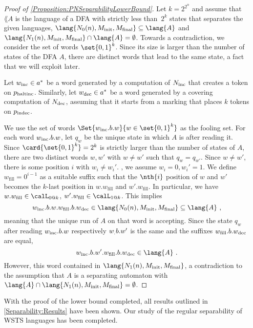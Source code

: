 \documentclass[../../diss.tex]{subfiles}
\begin{document}
\begin{proof}[Proof of \cref{Proposition:PNSeparabilityLowerBound}]
    Let $k = 2^{2^n}$ and assume that $\lang{A}$ is the language of a DFA with strictly less than~$2^k$ states that separates the given languages, \ie $\lang{N_0(n),\Minit,\Mfinal} \subseteq \lang{A}$ and $\lang{N_1(n),\Minit,\Mfinal} \cap \lang{A} = \emptyset$.
    Towards a contradiction, we consider the set of words $\set{0,1}^k$.
    Since its size is larger than the number of states of the DFA $A$, there are distinct words that lead to the same state, a fact that we will exploit later.

    Let $w_{\text{inc}} \in a^*$ be a word generated by a computation of $N_{\text{inc}}$ that creates a token on $p_{\text{haltinc}}$.
    Similarly, let $w_{\text{dec}} \in a^*$ be a word generated by a covering computation of $N_{\text{dec}}$, assuming that it starts from a marking that places $k$ tokens on $p_{\text{indec}}$.

    We use the set of words $\Set{ w_\textinc.b.w }{ w \in \set{0,1}^k}$ as the fooling set.
    For each word $w_{\text{inc}}.b.w$, let $q_w$ be the unique state in which $A$ is after reading it.
    Since $\card{\set{0,1}^k} = 2^k$ is strictly larger than the number of states of $A$, there are two distinct words $w,w'$ with $w \neq w'$ such that $q_{w} = q_{w'}$.
    Since $w \neq w'$, there is some position $i$ with $w_i \neq w_i'$.
    \Wolog, we assume $w_i = 0, w_i' = 1$.
    We define $w_{\text{fill}} = 0^{i-1}$ as a suitable suffix such that the $\nth{i}$ position  of $w$ and $w'$ becomes the $k$-last position in $w.w_{\text{fill}}$ and $w'.w_{\text{fill}}$.
    In particular, we have $w.w_{\text{fill}} \in \calL_{0 @ k}$, $w'.w_{\text{fill}} \in \calL_{1 @ k}$.
%
    This implies
    \[
        w_\textinc.b.w.w_{\text{fill}}.b.w_\textdec \in \lang{N_0(n),\Minit,\Mfinal} \subseteq \lang{A}
        \ ,
    \]
    meaning that the unique run of $A$ on that word is accepting.
    Since the state $q_w$ after reading $w_{\text{inc}}.b.w$ respectively $w_\text.b.w'$ is the same and the suffixes $w_{\text{fill}}.b.w_{\text{dec}}$ are equal,
    \[
        w_\textinc.b.w'.w_{\text{fill}}.b.w_\textdec \in \lang{A}
        \ .
    \]
    However, this word contained in $\lang{N_1(n),\Minit,\Mfinal}$, a contradiction to the assumption that $A$ is a separating automaton with $\lang{A} \cap \lang{N_1(n),\Minit,\Mfinal} = \emptyset$.
\end{proof}

With the proof of the lower bound completed, all results outlined in \cref{Separability:Results} have been shown.
Our study of the regular separability of WSTS languages has been completed.
\end{document}
